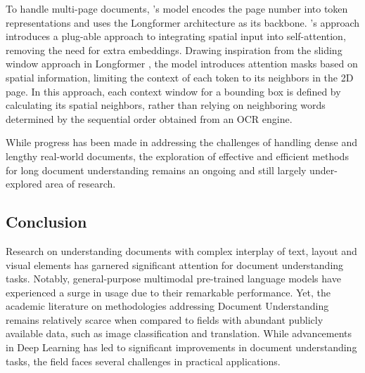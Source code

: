 To handle multi-page documents, \citet{pramanik2020towards}'s model encodes the page number into token representations and uses the Longformer architecture as its backbone. \citet{pham2022understanding}'s approach introduces a plug-able approach to integrating spatial input into self-attention, removing the need for extra embeddings. Drawing inspiration from the sliding window approach in Longformer \citep{beltagy2020longformer}, the model introduces attention masks based on spatial information, limiting the context of each token to its neighbors in the 2D page. In this approach, each context window for a bounding box is defined by calculating its spatial neighbors, rather than relying on neighboring words determined by the sequential order obtained from an \ac{OCR} engine.

While progress has been made in addressing the challenges of handling dense and lengthy real-world documents, the exploration of effective and efficient methods for long document understanding remains an ongoing and still largely under-explored area of research. 


\subsection{Conclusion}

Research on understanding documents with complex interplay of text, layout and visual elements has garnered significant attention for document understanding tasks. Notably, general-purpose multimodal pre-trained language models have experienced a surge in usage due to their remarkable performance. Yet, the academic literature on methodologies addressing Document Understanding remains relatively scarce when compared to fields with abundant publicly available data, such as image classification and translation. While advancements in Deep Learning has led to significant improvements in document understanding tasks, the field faces several challenges in practical applications. 

